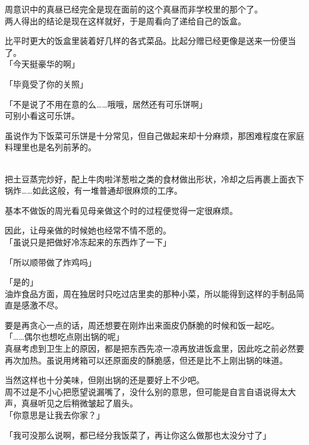 周意识中的真昼已经完全是现在面前的这个真昼而非学校里的那个了。\\

两人得出的结论是现在这样就好，于是周看向了递给自己的饭盒。

比平时更大的饭盒里装着好几样的各式菜品。比起分赠已经更像是送来一份便当了。\\

「今天挺豪华的啊」

「毕竟受了你的关照」

「不是说了不用在意的么……哦哦，居然还有可乐饼啊」\\

可别小看这可乐饼。

虽说作为下饭菜可乐饼是十分常见，但自己做起来却十分麻烦，那困难程度在家庭料理里也是名列前茅的。\\　%

把土豆蒸完炒好，配上牛肉啦洋葱啦之类的食材做出形状，冷却之后再裹上面衣下锅炸……如此这般，有一堆普通却很麻烦的工序。

基本不做饭的周光看见母亲做这个时的过程便觉得一定很麻烦。

因此，让母亲做的时候她也经常不情不愿的。\\

「虽说只是把做好冷冻起来的东西炸了一下」

「所以顺带做了炸鸡吗」

「是的」\\%

油炸食品方面，周在独居时只吃过店里卖的那种小菜，所以能得到这样的手制品简直是感激不尽。

要是再贪心一点的话，周还想要在刚炸出来面皮仍酥脆的时候和饭一起吃。\\

「……偶尔也想吃点刚出锅的呢」\\

真昼考虑到卫生上的原因，都是把东西先凉一凉再放进饭盒里，因此吃之前必然要再次加热。虽说用烤箱可以还原面皮的酥脆感，但还是比不上刚出锅的味道。

当然这样也十分美味，但刚出锅的还是要好上不少吧。\\

周不过是不小心把愿望说漏嘴了，没什么别的意思，但可能是自言自语说得太大声，真昼听见之后稍微皱起了眉头。\\%

「你意思是让我去你家？」

「我可没那么说啊，都已经分我饭菜了，再让你这么做那也太没分寸了」\\

